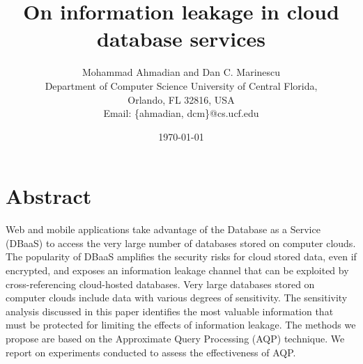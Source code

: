\documentclass[12pt]{article}
\begin{document}

\title{On information leakage in cloud database services}
\author{Mohammad Ahmadian and Dan C. Marinescu \\
Department of Computer Science University of Central Florida,\\ Orlando, FL 32816, USA\\
Email: \{ahmadian, dcm\}@cs.ucf.edu}
\date{\today}
\maketitle

\tableofcontents

\section*{Abstract}
Web and mobile applications take advantage of the Database as a Service (DBaaS) to access the very large number of databases stored on computer clouds. The popularity of DBaaS amplifies the security risks for cloud stored data, even if encrypted, and exposes an information leakage channel that can be exploited by cross-referencing  cloud-hosted databases. Very large databases stored on computer clouds include data with various degrees of sensitivity. The sensitivity analysis discussed in this paper identifies the most valuable information that must be protected for limiting the effects of information leakage. The methods we propose are based  on the Approximate Query Processing (AQP) technique.  We report on experiments conducted to assess the effectiveness of AQP.
 










\begin{appendices}



\end{appendices}



 
\end{document}
